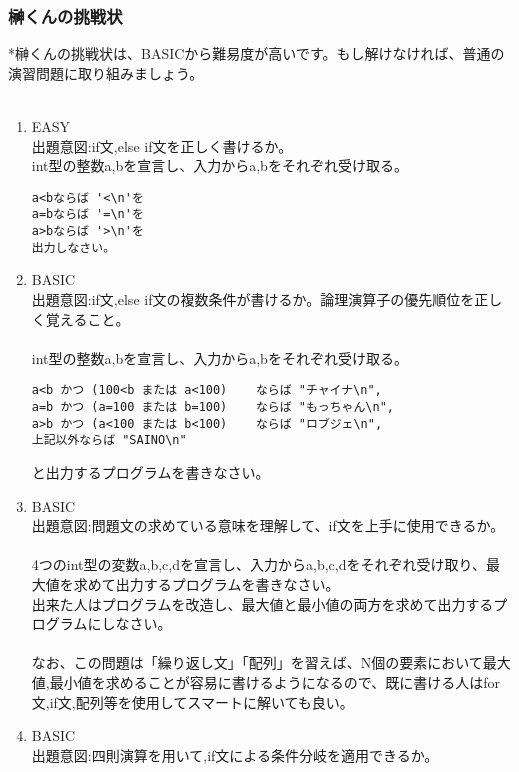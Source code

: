 \documentclass[a4j,titlepage,dvipdfmx]{jsarticle}   %
\begin{document}
\subsubsection{榊くんの挑戦状}
*榊くんの挑戦状は、BASICから難易度が高いです。もし解けなければ、普通の演習問題に取り組みましょう。\\
\\
\begin{enumerate}
\item EASY\\
出題意図:if文,else if文を正しく書けるか。\\

int型の整数a,bを宣言し、入力からa,bをそれぞれ受け取る。\\
\begin{verbatim}
a<bならば '<\n'を
a=bならば '=\n'を
a>bならば '>\n'を
出力しなさい。
\end{verbatim}
\item BASIC\\
出題意図:if文,else if文の複数条件が書けるか。論理演算子の優先順位を正しく覚えること。\\
\\
int型の整数a,bを宣言し、入力からa,bをそれぞれ受け取る。\\
\begin{verbatim}
a<b かつ (100<b または a<100) 	ならば "チャイナ\n",
a=b かつ (a=100 または b=100) 	ならば "もっちゃん\n",
a>b かつ (a<100 または b<100) 	ならば "ロブジェ\n",
上記以外ならば "SAINO\n"
\end{verbatim}
と出力するプログラムを書きなさい。\\
\item BASIC\\
出題意図:問題文の求めている意味を理解して、if文を上手に使用できるか。\\
\\
4つのint型の変数a,b,c,dを宣言し、入力からa,b,c,dをそれぞれ受け取り、最大値を求めて出力するプログラムを書きなさい。\\
出来た人はプログラムを改造し、最大値と最小値の両方を求めて出力するプログラムにしなさい。\\
\\
なお、この問題は「繰り返し文」「配列」を習えば、N個の要素において最大値,最小値を求めることが容易に書けるようになるので、既に書ける人はfor文,if文,配列等を使用してスマートに解いても良い。\\
\item BASIC\\
出題意図:四則演算を用いて,if文による条件分岐を適用できるか。\\

\end{enumerate}
\end{document}
